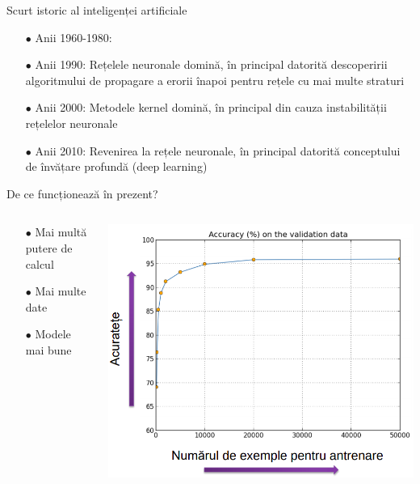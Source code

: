 \documentclass{beamer}
\begin{document}
\begin{frame}{Scurt istoric al inteligenței artificiale}
\begin{itemize}
	\item[$\bullet$] Anii 1960-1980: 
	\item[$\bullet$] Anii 1990: Rețelele neuronale domină, în principal datorită descoperirii algoritmului de propagare a erorii înapoi pentru rețele cu mai multe straturi
	\item[$\bullet$] Anii 2000: Metodele kernel domină, în principal din cauza instabilității rețelelor neuronale
	\item[$\bullet$] Anii 2010: Revenirea la rețele neuronale, în principal datorită conceptului de învățare profundă (deep learning)
\end{itemize}
\end{frame}

\begin{frame}{De ce funcționează în prezent?}
\begin{columns}
\begin{column}{0.4\textwidth}
	\begin{itemize}
		\item[$\bullet$] Mai multă putere de calcul
		\item[$\bullet$] Mai multe date
		\item[$\bullet$] Modele mai bune
	\end{itemize}
\end{column}
\begin{column}{0.5\textwidth}
    \begin{center}
	\includegraphics[scale=.24]{pic7.png}
     \end{center}
\end{column}
\end{columns}
\end{frame}
\end{document}
